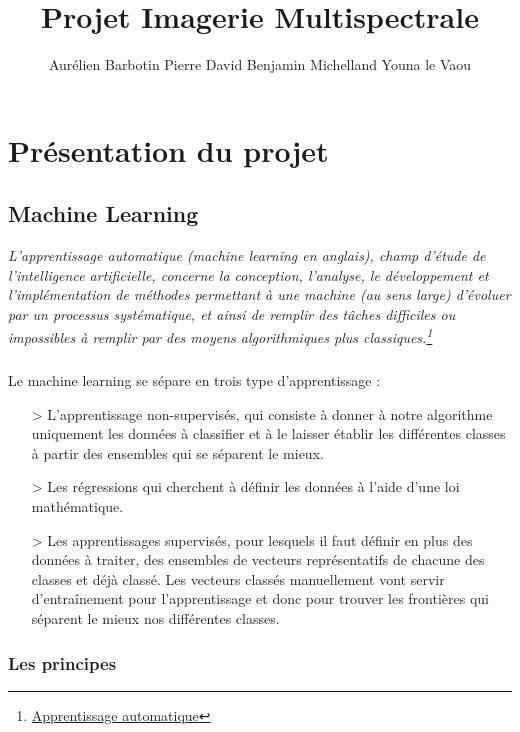 \documentclass[a4paper,10pt]{report}
\begin{document}
\title{Projet Imagerie Multispectrale}
\author{Aurélien Barbotin Pierre David Benjamin Michelland Youna le Vaou}

\maketitle

\chapter{Présentation du projet}

\section{Machine Learning}
\textit{L'apprentissage automatique (machine learning en anglais), champ d'étude de l'intelligence artificielle, concerne la conception, l'analyse, le développement et l'implémentation de méthodes permettant à une machine (au sens large) d'évoluer par un processus systématique, et ainsi de remplir des tâches difficiles ou impossibles à remplir par des moyens algorithmiques plus classiques.\footnote{\href{https://fr.wikipedia.org/wiki/Apprentissage_automatique}{Apprentissage automatique}}}
\paragraph{}
Le machine learning se sépare en trois type d'apprentissage :
\begin{itemize}
  \item[>] L'apprentissage non-supervisés, qui consiste à donner à notre algorithme uniquement les données à classifier et à le laisser établir les différentes classes à partir des ensembles qui se séparent le mieux.
  \item[>] Les régressions qui cherchent à définir les données à l'aide d'une loi mathématique.
  \item[>] Les apprentissages supervisés, pour lesquels il faut définir en plus des données à traiter, des ensembles de vecteurs représentatifs de chacune des classes et déjà classé. Les vecteurs classés manuellement vont servir d’entraînement pour l'apprentissage et donc pour trouver les frontières qui séparent le mieux nos différentes classes.
\end{itemize}
\subsection{Les principes}
\end{document}
